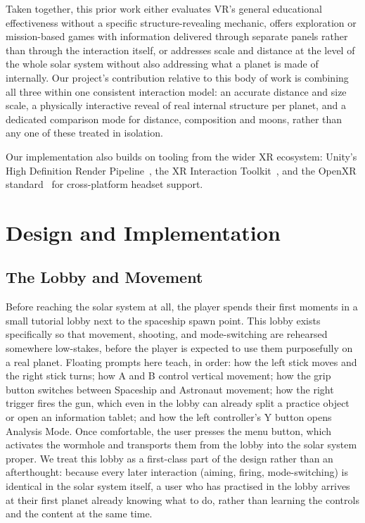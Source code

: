 \documentclass[journal]{vgtc}
\begin{document}
Taken together, this prior work either evaluates VR's general educational effectiveness without a specific structure-revealing mechanic, offers exploration or mission-based games with information delivered through separate panels rather than through the interaction itself, or addresses scale and distance at the level of the whole solar system without also addressing what a planet is made of internally. Our project's contribution relative to this body of work is combining all three within one consistent interaction model: an accurate distance and size scale, a physically interactive reveal of real internal structure per planet, and a dedicated comparison mode for distance, composition and moons, rather than any one of these treated in isolation.

Our implementation also builds on tooling from the wider XR ecosystem: Unity's High Definition Render Pipeline~\cite{hdrp}, the XR Interaction Toolkit~\cite{xrit}, and the OpenXR standard~\cite{openxr} for cross-platform headset support.

\section{Design and Implementation}

\subsection{The Lobby and Movement}
Before reaching the solar system at all, the player spends their first moments in a small tutorial lobby next to the spaceship spawn point. This lobby exists specifically so that movement, shooting, and mode-switching are rehearsed somewhere low-stakes, before the player is expected to use them purposefully on a real planet. Floating prompts here teach, in order: how the left stick moves and the right stick turns; how A and B control vertical movement; how the grip button switches between Spaceship and Astronaut movement; how the right trigger fires the gun, which even in the lobby can already split a practice object or open an information tablet; and how the left controller's Y button opens Analysis Mode. Once comfortable, the user presses the menu button, which activates the wormhole and transports them from the lobby into the solar system proper. We treat this lobby as a first-class part of the design rather than an afterthought: because every later interaction (aiming, firing, mode-switching) is identical in the solar system itself, a user who has practised in the lobby arrives at their first planet already knowing what to do, rather than learning the controls and the content at the same time.
\end{document}
